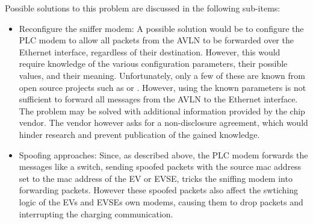 \documentclass[sigconf]{acmart}
\begin{document}
Possible solutions to this problem are discussed in the following sub-items:

\begin{itemize}
    \item Reconfigure the sniffer modem: A possible solution would be to configure the PLC modem to allow all packets from the AVLN to be forwarded over the Ethernet interface, regardless of their destination. However, this would require knowledge of the various configuration parameters, their possible values, and their meaning. Unfortunately, only a few of these are known from open source projects such as \citep{fluxiushomeplugpwn} or \citep{qcaopen-plc-utils}. However, using the known parameters is not sufficient to forward all messages from the AVLN to the Ethernet interface. The problem may be solved with additional information provided by the chip vendor. The vendor however asks for a non-disclosure agreement, which would hinder research and prevent publication of the gained knowledge.
    \item Spoofing approaches: Since, as described above, the PLC modem forwards the messages like a switch, sending spoofed packets with the source mac address set to the mac address of the EV or EVSE, tricks the sniffing modem into forwarding packets. However these spoofed packets also affect the swtiching logic of the EVs and EVSEs own modems, causing them to drop packets and interrupting the charging communication.

\end{itemize}
\end{document}
